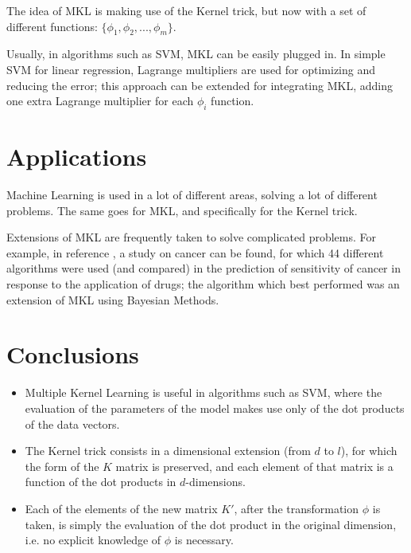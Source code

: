 \documentclass[paper=a4, fontsize=11pt]{scrartcl} %
\numberwithin{equation}{section} %
\numberwithin{figure}{section} %
\numberwithin{table}{section} %
\begin{document}
The idea of MKL is making use of the Kernel trick, but now with a set of different functions: $\{ \phi_{1}, \phi_{2}, ..., \phi_{m} \}$.

Usually, in algorithms such as SVM, MKL can be easily plugged in. In simple SVM for linear regression, Lagrange multipliers are used for optimizing and reducing the error; this approach can be extended for integrating MKL, adding one extra Lagrange multiplier for each $\phi_{i}$ function.






 



\section{Applications}

Machine Learning is used in a lot of different areas, solving a lot of different problems. The same goes for MKL, and specifically for the Kernel trick.

Extensions of MKL are frequently taken to solve complicated problems. For example, in reference \cite{cancer_research}, a study on cancer can be found, for which 44 different algorithms were used (and compared) in the prediction of sensitivity of cancer in response to the application of drugs; the algorithm which best performed was an extension of MKL using Bayesian Methods.




\section{Conclusions}

\begin{itemize}
\item Multiple Kernel Learning is useful in algorithms such as SVM, where the evaluation of the parameters of the model makes use only of the dot products of the data vectors.
\item The Kernel trick consists in a dimensional extension (from $d$ to $l$), for which the form of the $K$ matrix is preserved, and each element of that matrix is a function of the dot products in $d$-dimensions.
\item Each of the elements of the new matrix $K'$, after the transformation $\phi$ is taken, is simply the evaluation of the dot product in the original dimension, i.e. no explicit knowledge of $\phi$ is necessary.
\end{itemize}
\end{document}

